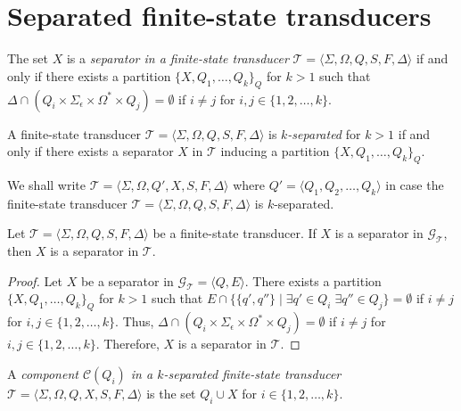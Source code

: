 \section{Separated finite-state transducers}

\begin{definition}
  The set $X$ is a \emph{separator in a finite-state transducer} $\mathcal{T} =
  \langle \Sigma, \Omega, Q, S, F, \Delta \rangle$ if and only if there exists a
  partition $\{ X, Q_1, \ldots, Q_k \}_Q$ for $k > 1$ such that $\Delta \cap (Q_i
  \times \Sigma_\epsilon \times \Omega^* \times Q_j) = \emptyset$ if $i \neq j$ for
  $i, j \in \{ 1, 2, \ldots, k \}$.
\end{definition}

\begin{definition}
  A finite-state transducer $\mathcal{T} = \langle \Sigma, \Omega, Q, S, F, \Delta
  \rangle$ is \emph{$k$-separated} for $k > 1$ if and only if there exists a
  separator $X$ in $\mathcal{T}$ inducing a partition $\{ X, Q_1, \ldots, Q_k
  \}_Q$.
\end{definition}

We shall write $\mathcal{T} = \langle \Sigma, \Omega, Q', X, S, F, \Delta \rangle$
where $Q' = \langle Q_1, Q_2, \ldots, Q_k \rangle$ in case the finite-state
transducer $\mathcal{T} = \langle \Sigma, \Omega, Q, S, F, \Delta \rangle$ is
$k$-separated.

\begin{proposition}
  Let $\mathcal{T} = \langle \Sigma, \Omega, Q, S, F, \Delta \rangle$ be a
  finite-state transducer. If $X$ is a separator in $\mathcal{G}_\mathcal{T}$,
  then $X$ is a separator in $\mathcal{T}$.
\end{proposition}

\begin{proof}
  Let $X$ be a separator in $\mathcal{G}_\mathcal{T} = \langle Q, E \rangle$. There
  exists a partition $\{ X, Q_1, \ldots, Q_k \}_Q$ for $k > 1$ such that $E \cap \{
  \{ q', q'' \} \mid \exists q' \in Q_i \; \exists q'' \in Q_j \} = \emptyset$ if $i
  \neq j$ for $i, j \in \{ 1, 2, \ldots, k \}$. Thus, $\Delta \cap (Q_i \times
  \Sigma_\epsilon \times \Omega^* \times Q_j) = \emptyset$ if $i \neq j$ for $i, j
  \in \{ 1, 2, \ldots, k \}$. Therefore, $X$ is a separator in $\mathcal{T}$.
\end{proof}

\begin{definition}
  A \emph{component $\mathcal{C}(Q_i)$ in a $k$-separated finite-state transducer}
  $\mathcal{T} = \langle \Sigma, \Omega, Q, X, S, F, \Delta \rangle$ is the set $Q_i
  \cup X$ for $i \in \{ 1, 2, \ldots, k \}$.
\end{definition}

